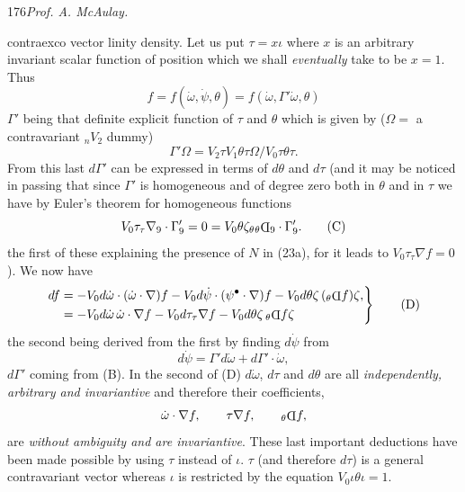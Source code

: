 \documentclass[11pt]{article}
\newcommand{\invd}{\mathord{\vcenter{\hbox{\rotatebox[origin=c]{180}{\(\mathrm{D}\)}}}}}
\newcommand{\thetaPi}{{}_\theta\invd}
\begin{document}
\newpage\thispagestyle{empty}\begin{center}176\hfill \textit{Prof. A. McAulay.}\end{center}
contraexco vector linity density. Let us put $\tau=x\iota$ where $x$ is an arbitrary invariant scalar function of position which we shall \emph{eventually} take to be $x=1$. Thus
\begin{equation}
  f=f(\dot\omega,\dot\psi,\theta)=f(\dot\omega,\Gamma'\dot\omega,\theta)
  \tag{A}
\end{equation}
$\Gamma'$ being that definite explicit function of $\tau$ and $\theta$ which is given by ($\Omega=$ a contravariant ${}_nV_2$ dummy)
\begin{equation}
  \Gamma'\Omega=V_2\tau V_1\theta\tau\Omega/V_0\tau\theta\tau.
  \tag{B}
\end{equation}
From this last $d\Gamma'$ can be expressed in terms of $d\theta$ and $d\tau$ (and it may be noticed in passing that since $\Gamma'$ is homogeneous and of degree zero both in $\theta$ and in $\tau$ we have by Euler's theorem for homogeneous functions
\begin{equation}
  V_0\tau_\tau\nabla_9\mathbin{\cdot}\Gamma_9'=0=V_0\theta\zeta_\theta\thetaPi_9\mathbin{\cdot}\Gamma_9'.
  \tag{C}
\end{equation}
the first of these explaining the presence of $N$ in (23a), for it leads to $V_0\tau_\tau\nabla f=0$). We now have
\begin{equation}
  \left.\begin{aligned}
    df&=-V_0d\dot\omega\mathbin{\cdot}(\dot\omega\mathbin{\cdot}\nabla)f-V_0d\dot\psi\mathbin{\cdot}(\psi^\bullet\mathbin{\cdot}\nabla)f-V_0d\theta\zeta\,(\thetaPi f)\zeta,\\
      &=-V_0d\dot\omega\,\dot\omega\mathbin{\cdot}\nabla f-V_0d\tau_\tau\nabla f-V_0d\theta\zeta\,\thetaPi f\zeta
  \end{aligned}\right\}
  \tag{D}
\end{equation}
the second being derived from the first by finding $d\dot\psi$ from
\[
  d\dot\psi=\Gamma'd\dot\omega+d\Gamma'\mathbin{\cdot}\dot\omega,
\]
$d\Gamma'$ coming from (B). In the second of (D) $d\dot\omega$, $d\tau$ and $d\theta$ are all \emph{independently, arbitrary and invariantive} and therefore their coefficients,
\[
  \dot\omega\mathbin{\cdot}\nabla f,\qquad \tau\nabla f,\qquad \thetaPi f,
\]
are \emph{without ambiguity and are invariantive}. These last important deductions have been made possible by using $\tau$ instead of $\iota$. $\tau$ (and therefore $d\tau$) is a general contravariant vector whereas $\iota$ is restricted by the equation $V_0\iota\theta\iota=1$.
\end{document}
